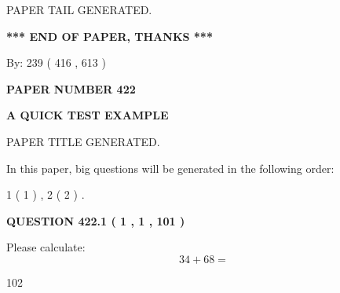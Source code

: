 \documentclass[12pt]{article}
\begin{document}
   
   
   
   
   
 \vspace{0.2in}
 
   
   
\vspace{2.0in} PAPER TAIL GENERATED.
   
   
   
   
\vspace{1.0in} 
{\textbf{\large{ *** END OF PAPER, THANKS *** }}} 
   
   
\hspace{1.0in} By: 
 239 ( 416 ,  613 )
   
   
   
   
\newpage 
\setcounter{page}{ 
   422001 } 
   
   
   
   
 {\textbf{ \Large{ PAPER NUMBER  422  }}}
   
   
\vspace{0.2in}
   
   
   
   
   
   
   
   
 \vspace{0.2in}
{\LARGE {\textbf{ A QUICK TEST EXAMPLE}}}
   
   
 PAPER TITLE GENERATED.
   
   
   
\vspace{0.2in}
   
In this paper, big questions will be generated in the following order: 
   
   
   1 ( 1 )
 ,
   2 ( 2 )
 .
  
\vspace{0.2in}
  
{\textbf{\Large{QUESTION
422.1 
 ( 1 , 1 , 101 )
}}}
  
  
 
Please calculate:
\begin{equation}
34 +  %
68 = \nonumber
\end{equation}
 
 
 
\noindent{}
 
 

102
 
\end{document}
